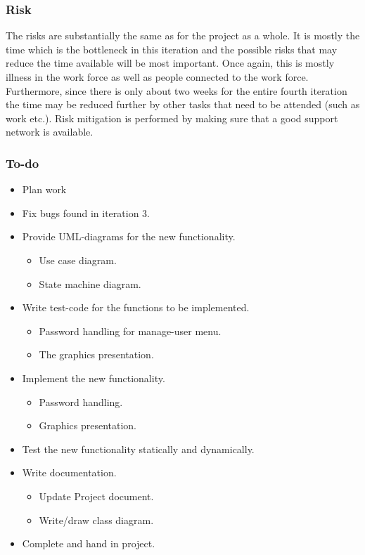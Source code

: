 \documentclass[12pt, letterpaper]{article}
\begin{document}
\subsubsection{Risk}
The risks are substantially the same as for the project as a whole. It is mostly the time which is the bottleneck in this iteration and the possible risks that may reduce the time available will be most important. Once again, this is mostly illness in the work force as well as people connected to the work force. Furthermore, since there is only about two weeks for the entire fourth iteration the time may be reduced further by other tasks that need to be attended (such as work etc.). Risk mitigation is performed by making sure that a good support network is available.
\subsubsection{To-do}
\begin{itemize}
	\item Plan work
	\item Fix bugs found in iteration 3.
	\item Provide UML-diagrams for the new functionality.
	\begin{itemize}
		\item Use case diagram.
		\item State machine diagram.
	\end{itemize}
	\item Write test-code for the functions to be implemented.
	\begin{itemize}
		\item Password handling for manage-user menu.
		\item The graphics presentation.
	\end{itemize}
	\item Implement the new functionality.
	\begin{itemize}
		\item Password handling.
		\item Graphics presentation.
	\end{itemize} 
	\item Test the new functionality statically and dynamically.
	\item Write documentation.
	\begin{itemize}
		\item Update Project document.
		\item Write/draw class diagram.
	\end{itemize}
	\item Complete and hand in project.
\end{itemize}
\end{document}
